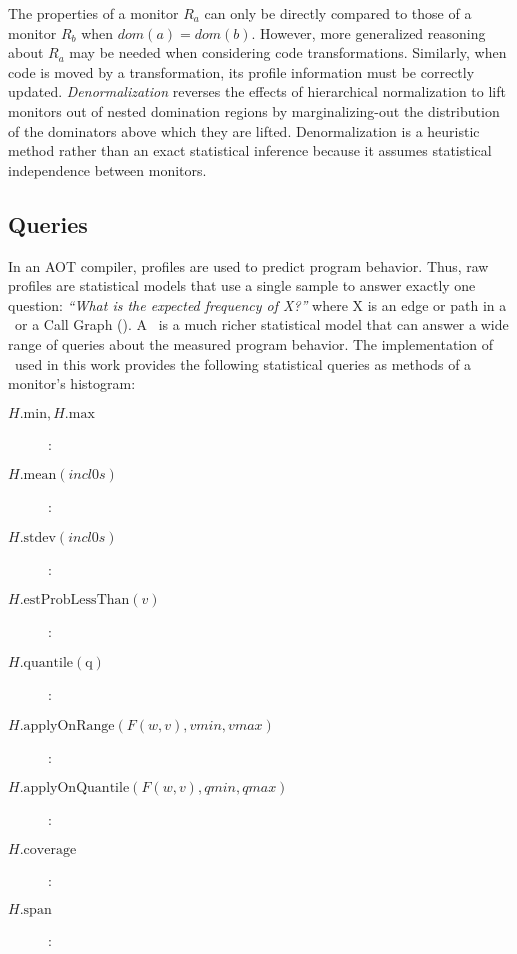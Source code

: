 The properties of a monitor $R_a$ can only be directly compared to
those of a monitor $R_b$ when $dom(a) = dom(b)$.  However, more
generalized reasoning about $R_a$ may be needed when considering code
transformations.  Similarly, when code is moved by a transformation,
its profile information must be correctly updated. {\it
  Denormalization} reverses the effects of hierarchical normalization
to lift monitors out of nested domination regions by marginalizing-out
the distribution of the dominators above which they are lifted.
Denormalization is a heuristic method rather than an exact statistical
inference because it assumes statistical independence between monitors.

\subsection{Queries}
\label{cp:queries}

In an AOT compiler, profiles are used to predict program behavior.
Thus, raw profiles are statistical models that use a single sample to
answer exactly one question: {\em ``What is the expected frequency of
  X?''}  where X is an edge or path in a \CFG\ or a Call Graph (\CG).
A \CP\ is a much richer statistical model that can answer a wide range
of queries about the measured program behavior.  The implementation of
\CP\ used in this work provides the following statistical queries as
methods of a monitor's histogram:
\begin{description}

\item[$H.\mathrm{min}, H.\mathrm{max}$]: 

\item[$H.\mathrm{mean}(\mathit{incl0s})$]: 

\item[$H.\mathrm{stdev}(\mathit{incl0s})$]: 

\item[$H.\mathrm{estProbLessThan}(v)$]: 

\item[$H.\mathrm{quantile(q)}$]: 

\item[$H.\mathrm{applyOnRange}(F(w,v),\mathit{vmin},\mathit{vmax})$]: 

\item[$H.\mathrm{applyOnQuantile}(F(w,v),\mathit{qmin},\mathit{qmax})$]: 

\item[$H.\mathrm{coverage}$]: 

\item[$H.\mathrm{span}$]: 

\end{description}

